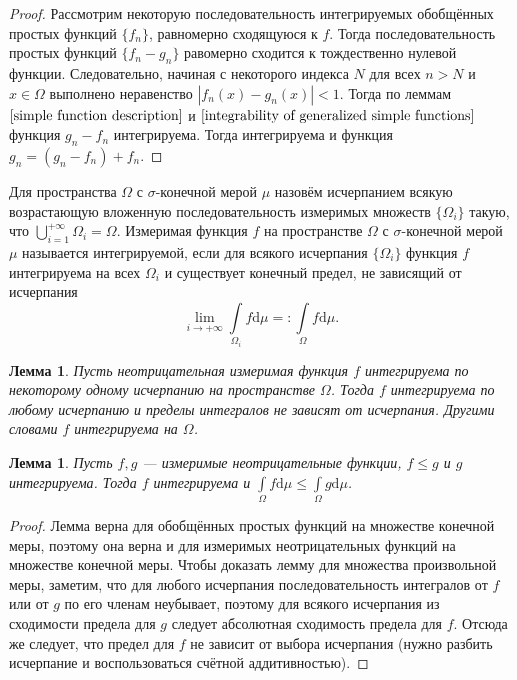 \documentclass[12pt]{article}
\newtheorem{lemma}[theorem]{Лемма}
\numberwithin{theorem}{section}
\theoremstyle{definition}
\newcommand{\defin}[2]{\hypertarget{#2}{{\color{red} #1}}}
\newcommand{\diff}{\mathrm{d}}
\begin{document}
	\begin{proof}
		Рассмотрим некоторую последовательность интегрируемых обобщённых простых функций $ \{f_n\} $,
		равномерно сходящуюся к $ f $.
		Тогда последовательность простых функций $ \{f_n - g_n\} $ равомерно сходится к тождественно нулевой функции.
		Следовательно, начиная с некоторого индекса $ N $ для всех $ n > N $ и $ x \in \Omega $ выполнено неравенство
		$ |f_n(x) - g_n(x)| < 1 $.
		Тогда по леммам $ \ref{simple function description} $ и $ \ref{integrability of generalized simple functions} $ функция $ g_n - f_n $ интегрируема. Тогда интегрируема и функция $ g_n = (g_n - f_n) + f_n $.
	\end{proof}
	
	Для пространства $ \Omega $ с $ \sigma $-конечной мерой $ \mu $ назовём \defin{исчерпанием}{} всякую возрастающую вложенную 
	последовательность измеримых множеств $ \{\Omega_i\} $ такую, что $ \bigcup\limits_{i = 1}^{+\infty} \Omega_i = \Omega $.  
	Измеримая функция $ f $ на пространстве $ \Omega $ с $ \sigma $-конечной мерой $ \mu $ называется
	\defin{интегрируемой}{integrable-inf}, 
	если для всякого исчерпания $ \{\Omega_i\} $ функция $ f $ интегрируема на всех $ \Omega_i $
	и существует конечный предел, не зависящий от исчерпания
	$$ \lim\limits_{i \to +\infty} \int\limits_{\Omega_i} f\diff\mu =: \int\limits_{\Omega} f\diff\mu. $$
	
	\begin{lemma}
		Пусть неотрицательная измеримая функция $ f $ интегрируема по некоторому одному исчерпанию на пространстве $ \Omega $.
		Тогда $ f $ интегрируема по любому исчерпанию и пределы интегралов не зависят от исчерпания.
		Другими словами $ f $ интегрируема на $ \Omega $.
	\end{lemma}
	
	\begin{lemma}
		Пусть $ f, g $ --- измеримые неотрицательные функции, $ f \leqslant g $ и $ g $ интегрируема.
		Тогда $ f $ интегрируема и $ \int\limits_{\Omega} f\diff\mu \leqslant \int\limits_{\Omega} g\diff\mu $.
	\end{lemma}
	
	\begin{proof}
		Лемма верна для обобщённых простых функций на множестве конечной меры, поэтому она верна
		и для измеримых неотрицательных функций на множестве конечной меры.
		Чтобы доказать лемму для множества произвольной меры, заметим,
		что для любого исчерпания последовательность интегралов от $ f $ или от $ g $ 
		по его членам неубывает, поэтому для всякого исчерпания из сходимости
		предела для $ g $ следует абсолютная сходимость предела для $ f $.
		Отсюда же следует, что предел для $ f $ не зависит от выбора исчерпания 
		(нужно разбить исчерпание и воспользоваться счётной аддитивностью).
	\end{proof}
	
\end{document}
